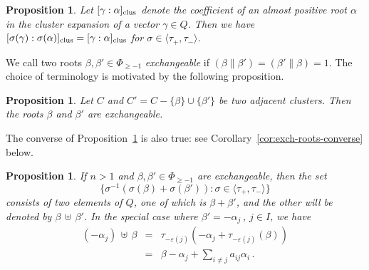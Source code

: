 \documentclass[letterpaper]{amsart}
\numberwithin{equation}{section}
\newtheorem{proposition}[theorem]{Proposition}
\theoremstyle{definition}
\newtheorem{remark}[theorem]{Remark}
\def\subplus{{\,\uplus\,} }
\begin{document}
\begin{proposition} 
\label{prop:inv-cluster-expansion-2} 
{\rm \cite[Proposition~1.13]{cfz}} 
Let $[\gamma: \alpha]_{\rm clus}$ denote the coefficient of 
an almost positive root $\alpha$ in the cluster expansion of a 
vector $\gamma \in Q$. 
Then we have 
$[\sigma (\gamma): \sigma (\alpha)]_{\rm clus} = [\gamma: \alpha]_{\rm clus}$ 
for $\sigma\in\langle \tau_+, \tau_- \rangle$. 
\end{proposition} 
 
We call two roots $\beta,\beta'\in\Phi_{\geq -1}$ \emph{exchangeable} 
if $(\beta\|\beta')=(\beta'\|\beta) = 1$. 
The choice of terminology is motivated by the following proposition. 
 
 
 
\begin{proposition} 
\label{pr:two-terms-1} 
{\rm \cite[Lemma~2.2]{cfz}} 
Let $C$ and $C'=C-\{\beta\}\cup\{\beta'\}$ be two adjacent 
clusters. 
Then the roots $\beta$ and $\beta'$ are exchangeable. 
\end{proposition} 
 
\pagebreak[3] 
 
The converse of Proposition~\ref{pr:two-terms-1} is also true: see 
Corollary~\ref{cor:exch-roots-converse} below. 
 
\begin{proposition} 
\label{pr:two-terms-2} 
{\rm \cite[Theorem~1.14]{cfz}} 
If $n>1$ and $\beta,\beta'\in\Phi_{\geq -1}$ are exchangeable, 
then the set 
\[ 
\{\sigma^{-1} (\sigma (\beta) + \sigma (\beta')): \sigma \in 
\langle \tau_+, \tau_- \rangle \} 
\] 
consists of two elements of $Q$, one of 
which is $\beta + \beta'$, and the other will be denoted by 
$\beta \subplus \beta'$. 
% 
In the special case where $\beta'=-\alpha_j\,$, $j\in I$, we have 
\begin{equation} 
\label{eq:subplus-special} 
\begin{array}{rcl} 
(- \alpha_j)\subplus \beta &=& 
\tau_{- \varepsilon (j)}(- \alpha_j+\tau_{- \varepsilon (j)}(\beta)) \\[.1in] 
&=& \beta - \alpha_j + \sum_{i\neq j} a_{ij}\alpha_i\,. 
\end{array} 
\end{equation} 
\end{proposition} 
 
\end{document}
